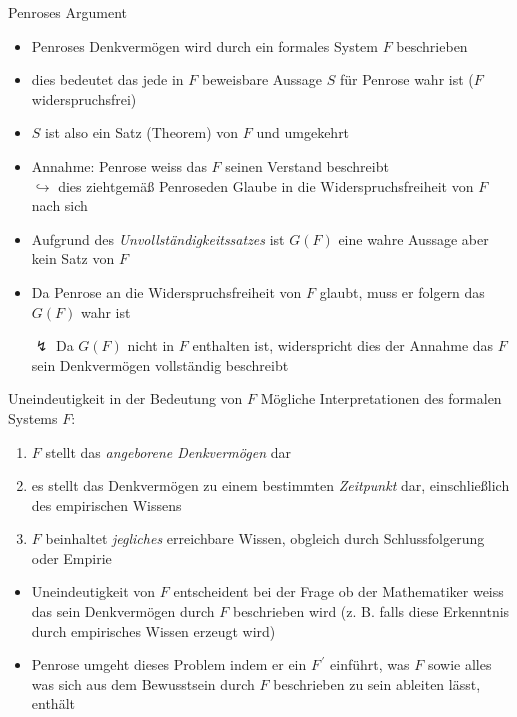 \begin{frame}{Penroses Argument}
\label{sec:penrose_argument}
    \begin{itemize}
        \item Penroses Denkvermögen wird durch ein formales System $F$ beschrieben
        \item dies bedeutet das jede in $F$ beweisbare Aussage $S$ für Penrose wahr ist ($F$ widerspruchsfrei)
        \item $S$ ist also ein Satz (Theorem) von $F$ und umgekehrt
        \item Annahme: Penrose weiss das $F$ seinen Verstand beschreibt\\
        $\hookrightarrow$ dies zieht\textemdash{}gemäß Penrose\textemdash{}den Glaube in die Widerspruchsfreiheit von $F$ nach sich
        \item Aufgrund des \emph{Unvollständigkeitssatzes} ist $G(F)$ eine wahre Aussage aber kein Satz von $F$
        \item Da Penrose an die Widerspruchsfreiheit von $F$ glaubt, muss er folgern das $G(F)$ wahr ist
        \item[$\lightning$] Da $G(F)$ nicht in $F$ enthalten ist, widerspricht dies der Annahme das $F$ sein Denkvermögen vollständig beschreibt
    \end{itemize}
\end{frame}

\begin{frame}
    \begin{block}{Uneindeutigkeit in der Bedeutung von $F$}
        Mögliche Interpretationen des formalen Systems $F$:
        \begin{enumerate}
            \item $F$ stellt das \emph{angeborene Denkvermögen} dar
            \item es stellt das Denkvermögen zu einem bestimmten \emph{Zeitpunkt} dar, einschließlich des empirischen Wissens
            \item $F$ beinhaltet \emph{jegliches} erreichbare Wissen, obgleich durch Schlussfolgerung oder Empirie
        \end{enumerate}
    \end{block}
    \begin{itemize}
        \item Uneindeutigkeit von $F$ entscheident bei der Frage ob der Mathematiker weiss das sein Denkvermögen durch $F$ beschrieben wird (z. B. falls diese Erkenntnis durch empirisches Wissen erzeugt wird)
        \item Penrose umgeht dieses Problem indem er ein $F^{\,'}$ einführt, was $F$ sowie alles was sich aus dem Bewusstsein durch $F$ beschrieben zu sein ableiten lässt, enthält
    \end{itemize}
\end{frame}


